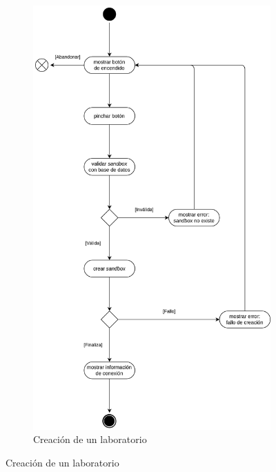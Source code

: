             \begin{figure}[h]
                \centering
                \begin{subfigure}{0.45\textwidth}
                    \centering
                    \includegraphics[scale=0.115]{images/Diagramas/Actividades y transiciones 4.png}
                    \caption{Creación de un laboratorio}
                    \label{fig:creacion-laboratorio}
                \end{subfigure}

\end{figure}
